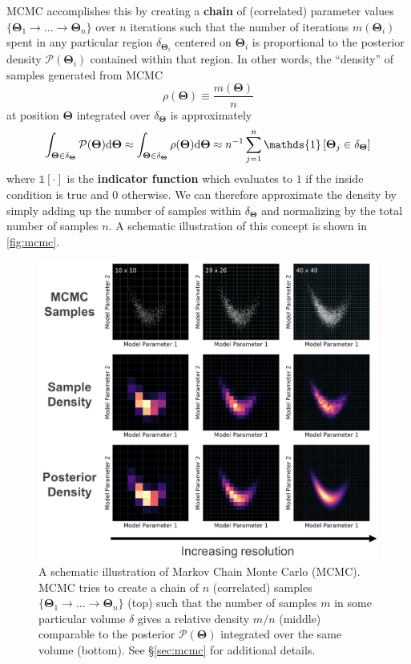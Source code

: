 \documentclass[12pt, titlepage]{article}
\newcommand{\deriv}{\ensuremath{{\rm d}}}  %
\newcommand{\indicator}[1]{\ensuremath{\mathds{1}\left[{#1}\right]}}
\newcommand{\params}{\ensuremath{\boldsymbol\Theta}}
\newcommand{\posterior}{\ensuremath{\mathcal{P}}}
\begin{document}
MCMC accomplishes this by creating a \textbf{chain} of 
(correlated) parameter values 
$\{ \params_1 \rightarrow \dots \rightarrow \params_n \}$
over $n$ iterations such that the number of iterations $m(\params_i)$
spent in any particular region $\delta_{\params_i}$ 
centered on $\params_i$ is proportional to the posterior 
density $\posterior(\params_i)$ contained within that region.
In other words, the ``density'' of samples generated from MCMC
\begin{equation}
    \rho(\params) \equiv \frac{m(\params)}{n}
\end{equation}
at position $\params$ integrated over $\delta_{\params}$ is approximately
\begin{equation}
    \int_{\params \in \delta_{\params}} \posterior(\params) \deriv \params
    \approx \int_{\params \in \delta_{\params}} \rho(\params) \deriv \params 
    \approx n^{-1} \sum_{j=1}^{n} \indicator{\params_j \in \delta_{\params}}
\end{equation}
where $\indicator{\cdot}$ is the \textbf{indicator function} which evaluates to
$1$ if the inside condition is true and $0$ otherwise. We can therefore
approximate the density by simply
adding up the number of samples within $\delta_{\params}$
and normalizing by the total number of samples $n$.
A schematic illustration of this concept is shown in
{\color{red} \autoref{fig:mcmc}}.

\begin{figure}
\begin{center}
\includegraphics[width=\textwidth]{figures/fig8.png}
\end{center}
\caption{A schematic illustration of Markov Chain Monte Carlo (MCMC).
MCMC tries to create a chain of $n$ (correlated) samples 
$\{ \params_1 \rightarrow \dots \rightarrow \params_n \}$ (top)
such that the number of samples $m$ in some particular volume
$\delta$ gives a relative density $m/n$ (middle) comparable to the
posterior $\posterior(\params)$ integrated over the same volume (bottom).
See \S\ref{sec:mcmc} for additional details.
}\label{fig:mcmc}
\end{figure}
\end{document}
